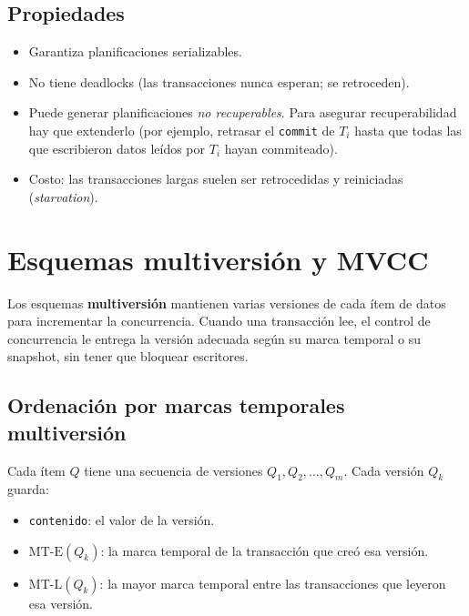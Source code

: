 \documentclass[11pt,a4paper]{article}
\begin{document}
\subsection{Propiedades}

\begin{itemize}
    \item Garantiza planificaciones serializables.
    \item No tiene deadlocks (las transacciones nunca esperan; se retroceden).
    \item Puede generar planificaciones \emph{no recuperables}. Para
    asegurar recuperabilidad hay que extenderlo (por ejemplo, retrasar
    el \texttt{commit} de $T_i$ hasta que todas las que escribieron datos
    leídos por $T_i$ hayan commiteado).
    \item Costo: las transacciones largas suelen ser retrocedidas y
    reiniciadas (\emph{starvation}).
\end{itemize}

\section{Esquemas multiversión y MVCC}

Los esquemas \textbf{multiversión} mantienen varias versiones de cada
ítem de datos para incrementar la concurrencia. Cuando una transacción
lee, el control de concurrencia le entrega la versión adecuada según su
marca temporal o su snapshot, sin tener que bloquear escritores.

\subsection{Ordenación por marcas temporales multiversión}

Cada ítem $Q$ tiene una secuencia de versiones $Q_1, Q_2, \ldots, Q_m$.
Cada versión $Q_k$ guarda:

\begin{itemize}
    \item \texttt{contenido}: el valor de la versión.
    \item $\mathrm{MT\text{-}E}(Q_k)$: la marca temporal de la
    transacción que creó esa versión.
    \item $\mathrm{MT\text{-}L}(Q_k)$: la mayor marca temporal entre las
    transacciones que leyeron esa versión.
\end{itemize}
\end{document}
